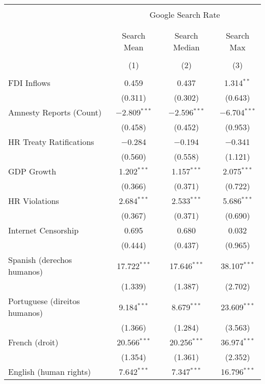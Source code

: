 
\begin{table}[!htbp] \centering 
  \caption{} 
  \label{} 
\begin{tabular}{@{\extracolsep{5pt}}lccc} 
\\[-1.8ex]\hline 
\hline \\[-1.8ex] 
 & \multicolumn{3}{c}{Google Search Rate} \\ 
\cline{2-4} 
\\[-1.8ex] & \multicolumn{3}{c}{ } \\ 
 & Search Mean & Search Median & Search Max \\ 
\\[-1.8ex] & (1) & (2) & (3)\\ 
\hline \\[-1.8ex] 
 FDI Inflows & 0.459 & 0.437 & 1.314$^{**}$ \\ 
  & (0.311) & (0.302) & (0.643) \\ 
  Amnesty Reports (Count) & $-$2.809$^{***}$ & $-$2.596$^{***}$ & $-$6.704$^{***}$ \\ 
  & (0.458) & (0.452) & (0.953) \\ 
  HR Treaty Ratifications & $-$0.284 & $-$0.194 & $-$0.341 \\ 
  & (0.560) & (0.558) & (1.121) \\ 
  GDP Growth & 1.202$^{***}$ & 1.157$^{***}$ & 2.075$^{***}$ \\ 
  & (0.366) & (0.371) & (0.722) \\ 
  HR Violations & 2.684$^{***}$ & 2.533$^{***}$ & 5.686$^{***}$ \\ 
  & (0.367) & (0.371) & (0.690) \\ 
  Internet Censorship & 0.695 & 0.680 & 0.032 \\ 
  & (0.444) & (0.437) & (0.965) \\ 
  Spanish (derechos humanos) & 17.722$^{***}$ & 17.646$^{***}$ & 38.107$^{***}$ \\ 
  & (1.339) & (1.387) & (2.702) \\ 
  Portuguese (direitos humanos) & 9.184$^{***}$ & 8.679$^{***}$ & 23.609$^{***}$ \\ 
  & (1.366) & (1.284) & (3.563) \\ 
  French (droit) & 20.566$^{***}$ & 20.256$^{***}$ & 36.974$^{***}$ \\ 
  & (1.354) & (1.361) & (2.352) \\ 
  English (human rights) & 7.642$^{***}$ & 7.347$^{***}$ & 16.796$^{***}$ \\ 

\end{tabular}
\end{table}
